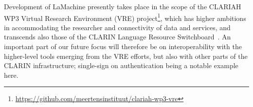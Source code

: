 \documentclass[a4paper,11pt]{article}
\begin{document}
Development of LaMachine presently takes place in the scope of the CLARIAH WP3 Virtual Research Environment (VRE)
project\footnote{\url{https://github.com/meertensinstituut/clariah-wp3-vre}}, which has higher ambitions in
accommodating the researcher and connectivity of data and services, and transcends also those of the CLARIN Language
Resource Switchboard~\cite{switchboard}. An important part of our future focus will therefore be on interoperability
with the higher-level tools emerging from the VRE efforts, but also with other parts of the CLARIN infrastructure;
single-sign on authentication being a notable example here.



\end{document}
